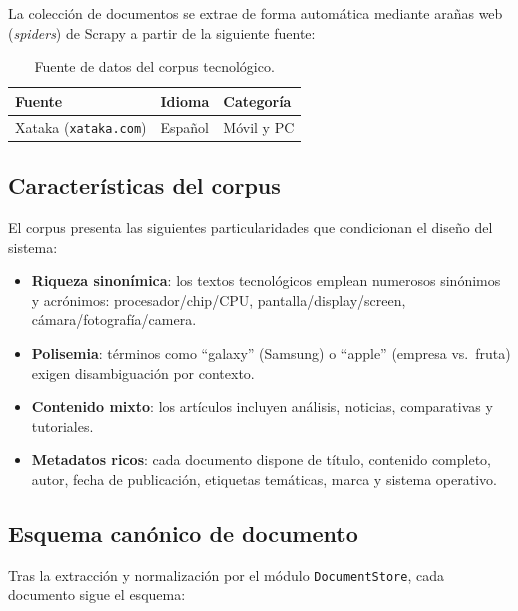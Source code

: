 \documentclass{llncs}
\begin{document}
La colección de documentos se extrae de forma automática mediante arañas web
(\textit{spiders}) de Scrapy a partir de la siguiente fuente:

\begin{table}[h]
  \centering
  \caption{Fuente de datos del corpus tecnológico.}
  \begin{tabular}{lll}
    \toprule
    \textbf{Fuente} & \textbf{Idioma} & \textbf{Categoría} \\
    \midrule
    Xataka (\texttt{xataka.com}) & Español & Móvil y PC \\
    \bottomrule
  \end{tabular}
\end{table}

\subsection{Características del corpus}

El corpus presenta las siguientes particularidades que condicionan el diseño
del sistema:

\begin{itemize}
  \item \textbf{Riqueza sinonímica}: los textos tecnológicos emplean
    numerosos sinónimos y acrónimos: procesador/chip/CPU,
    pantalla/display/screen, cámara/fotografía/camera.
  \item \textbf{Polisemia}: términos como ``galaxy'' (Samsung) o ``apple''
    (empresa vs.\ fruta) exigen disambiguación por contexto.
  \item \textbf{Contenido mixto}: los artículos incluyen análisis, noticias,
    comparativas y tutoriales.
  \item \textbf{Metadatos ricos}: cada documento dispone de título, contenido
    completo, autor, fecha de publicación, etiquetas temáticas, marca y
    sistema operativo.
\end{itemize}

\subsection{Esquema canónico de documento}

Tras la extracción y normalización por el módulo \texttt{DocumentStore}, cada
documento sigue el esquema:
\end{document}
